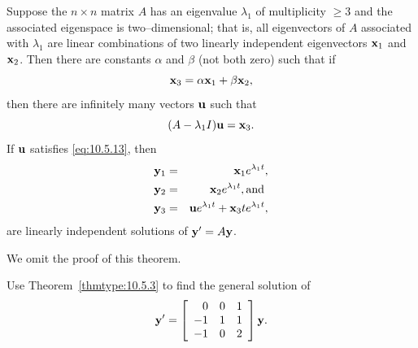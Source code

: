\begin{theorem}
  \color{blue}
  \label{thmtype:10.5.3} Suppose the $n\times n$ matrix $A$ has an eigenvalue $\lambda_{1}$ of
  multiplicity $\ge3$ and the associated eigenspace is two--dimensional; that is, all eigenvectors
  of $A$ associated with $\lambda_{1}$ are linear combinations of two linearly independent
  eigenvectors ${\bf x}_{1}$ and ${\bf x}_{2}$. Then there are constants $\alpha$ and $\beta$ (not
  both zero) such that if
  \begin{equation}
    \label{eq:10.5.12}{\bf x}_{3}=\alpha{\bf x}_{1}+\beta{\bf x}_{2},
  \end{equation}
  then there are infinitely many vectors ${\bf u}$ such that
  \begin{equation}
    \label{eq:10.5.13}(A-\lambda_{1}I){\bf u}={\bf x}_{3}.
  \end{equation}
  If ${\bf u}$ satisfies {\rm\eqref{eq:10.5.13}}, then
  \begin{eqnarray}
    {\bf y}_{1} & = & {\bf x}_{1}e^{\lambda_{1}t},\nonumber            \\
    {\bf y}_{2} & = & {\bf x}_{2}e^{\lambda_{1}t},\mbox{and }\nonumber \\
    {\bf y}_{3} & = & {\bf u}e^{\lambda_{1}t}+{\bf x}_{3}te^{\lambda_{1}t}\label{eq:10.5.14},
  \end{eqnarray}
  are linearly independent solutions of ${\bf y}'=A{\bf y}$.
\end{theorem}

We omit the proof of this theorem.

\newpage

\begin{example}
  \label{example:10.5.5}\rm Use Theorem~\ref{thmtype:10.5.3} to find the general solution of
  \begin{equation}
    \label{eq:10.5.15}{\bf y}'=\left[\begin{array}{rrr} 0&0&1\\-1&1&1\\-1&0&2\end{array}\right]{\bf y}.
  \end{equation}
\end{example}

